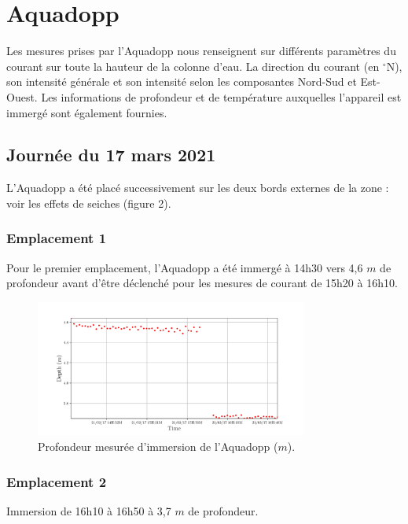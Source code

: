 \documentclass[12pt]{article}
\begin{document}
\section{Aquadopp}
Les mesures prises par l'Aquadopp nous renseignent sur différents paramètres du courant sur toute la hauteur de la colonne d'eau. La direction du courant (en $^{\circ}$N), son intensité générale et son intensité selon les composantes Nord-Sud et Est-Ouest. Les informations de profondeur et de température auxquelles l'appareil est immergé sont également fournies.

\subsection{Journée du 17 mars 2021}
L'Aquadopp a été placé successivement sur les deux bords externes de la zone : voir les effets de seiches (figure 2).

\subsubsection{Emplacement 1}
Pour le premier emplacement, l'Aquadopp a été immergé à 14h30 vers 4,6 $m$ de profondeur avant d'être déclenché pour les mesures de courant de 15h20 à 16h10.
	
	\begin{figure}[!ht]
		\begin{center}
			\includegraphics[width=0.8\textwidth]{1703F03depth.png}
			\caption{Profondeur mesurée d'immersion de l'Aquadopp ($m$).}
		\end{center}
	\end{figure}

\subsubsection{Emplacement 2}
	Immersion de 16h10 à 16h50 à 3,7 $m$ de profondeur.
	
\end{document}

